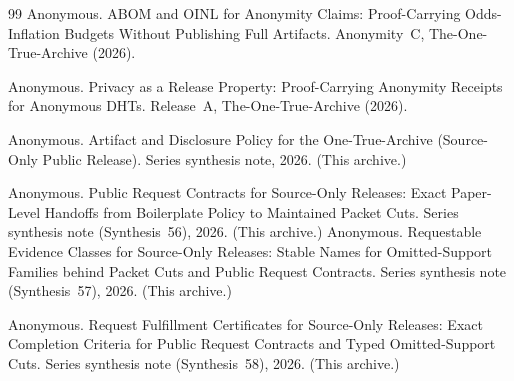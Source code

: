 \documentclass[11pt]{article}
\begin{document}
\begin{thebibliography}{99}
Anonymous.
\newblock ABOM and OINL for Anonymity Claims: Proof-Carrying Odds-Inflation Budgets Without Publishing Full Artifacts.
\newblock Anonymity~C, The-One-True-Archive (2026).

Anonymous.
\newblock Privacy as a Release Property: Proof-Carrying Anonymity Receipts for Anonymous DHTs.
\newblock Release~A, The-One-True-Archive (2026).

Anonymous.
\newblock Artifact and Disclosure Policy for the One-True-Archive (Source-Only Public Release).
\newblock Series synthesis note, 2026. (This archive.)

Anonymous.
\newblock Public Request Contracts for Source-Only Releases: Exact Paper-Level Handoffs from Boilerplate Policy to Maintained Packet Cuts.
\newblock Series synthesis note (Synthesis~56), 2026. (This archive.)
Anonymous.
\newblock Requestable Evidence Classes for Source-Only Releases: Stable Names for Omitted-Support Families behind Packet Cuts and Public Request Contracts.
\newblock Series synthesis note (Synthesis~57), 2026. (This archive.)

Anonymous.
\newblock Request Fulfillment Certificates for Source-Only Releases: Exact Completion Criteria for Public Request Contracts and Typed Omitted-Support Cuts.
\newblock Series synthesis note (Synthesis~58), 2026. (This archive.)

\end{thebibliography}
\end{document}
